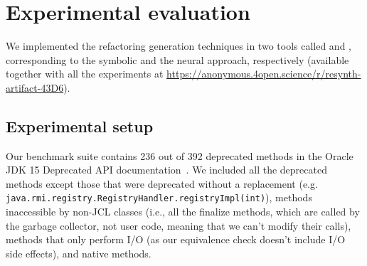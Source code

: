 \documentclass[sigconf,review,anonymous]{acmart}
\begin{document}


\section{Experimental evaluation}\label{sec:experimental-results}

We implemented the refactoring generation techniques in two tools called \tool and \llm, corresponding to the symbolic and the neural approach, respectively (available together with all the experiments at \url{https://anonymous.4open.science/r/resynth-artifact-43D6}).

\subsection{Experimental setup}

Our benchmark suite contains 236 out of 392 deprecated methods in the Oracle
JDK 15 Deprecated API documentation~\cite{OracleJdk15DeprecatedAPI}.
We included all the deprecated methods except those that were deprecated without a replacement (e.g. \lstinline[breaklines=true]{java.rmi.registry.RegistryHandler.registryImpl(int)}), 
methods inaccessible by non-JCL classes (i.e., all the finalize methods, which are called by the garbage collector, not user code, meaning that we can't modify their calls), 
methods that only perform I/O (as our equivalence check doesn't include I/O side effects),
and native methods.
\end{document}
